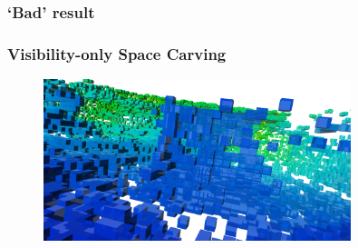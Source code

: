 \documentclass{beamer}
\begin{document}
\begin{frame}
  \frametitle{`Bad' result}
  \begin{figure}[htb!]
   \centering
  \end{figure}
\end{frame}

\begin{frame}
  \frametitle{Visibility-only Space Carving}
  \begin{figure}[htb!]
   \centering
   \includegraphics[width=0.8\textwidth]{img/memorial_carve1}
  \end{figure}
\end{frame}
\end{document}
